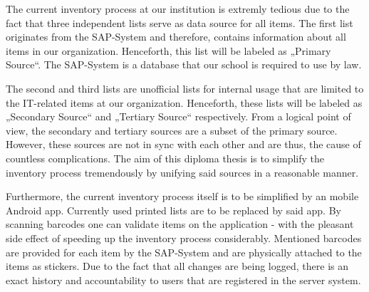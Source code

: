 The current inventory process at our institution is extremly tedious due to the fact that three independent lists serve as 
data source for all items. The first list originates from the SAP-System and therefore, contains information about all items in our organization.
Henceforth, this list will be labeled as „Primary Source“. The SAP-System is a database that our school is required to use by law. 

The second and third lists are unofficial lists for internal usage that are limited to the IT-related items at our organization. 
Henceforth, these lists will be labeled as „Secondary Source“ and „Tertiary Source“ respectively.  From a logical point of view, 
the secondary and tertiary sources are a subset of the primary source. However, these sources are not in sync with each other and are thus, the cause 
of countless complications. The aim of this diploma thesis is to simplify the inventory process tremendously by unifying said sources in a reasonable manner.

Furthermore, the current inventory process itself is to be simplified by an mobile Android app. Currently used printed lists are to be replaced 
by said app. By scanning barcodes one can validate items on the application - with the pleasant side effect of speeding up the inventory process
considerably. Mentioned barcodes are provided for each item by the SAP-System and are physically attached to the items as stickers. 
Due to the fact that all changes are being logged, there is an exact history and accountability to users that are registered in the server system.